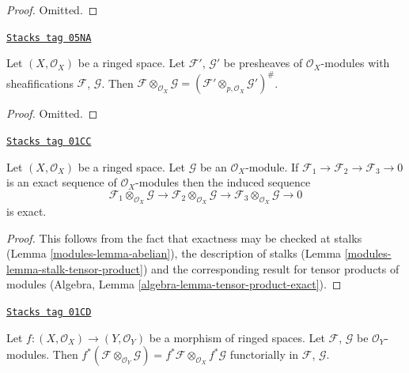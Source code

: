 \begin{proof}
Omitted.
\end{proof}

\begin{lemma}
\label{modules-lemma-tensor-product-sheafification}
\href{https://stacks.math.columbia.edu/tag/05NA}{\texttt{Stacks tag 05NA}}

Let $(X, \mathcal{O}_X)$ be a ringed space.
Let $\mathcal{F}'$, $\mathcal{G}'$ be presheaves of $\mathcal{O}_X$-modules
with sheafifications $\mathcal{F}$, $\mathcal{G}$. Then
$\mathcal{F} \otimes_{\mathcal{O}_X} \mathcal{G} =
(\mathcal{F}' \otimes_{p, \mathcal{O}_X} \mathcal{G}')^\#$.
\end{lemma}

\begin{proof}
Omitted.
\end{proof}


\begin{lemma}
\label{modules-lemma-tensor-product-exact}
\href{https://stacks.math.columbia.edu/tag/01CC}{\texttt{Stacks tag 01CC}}

Let $(X, \mathcal{O}_X)$ be a ringed space.
Let $\mathcal{G}$ be an $\mathcal{O}_X$-module.
If
$\mathcal{F}_1
\to \mathcal{F}_2
\to \mathcal{F}_3
\to 0$
is an exact sequence of $\mathcal{O}_X$-modules then
the induced sequence
$$
\mathcal{F}_1 \otimes_{\mathcal{O}_X} \mathcal{G} \to
\mathcal{F}_2 \otimes_{\mathcal{O}_X} \mathcal{G} \to
\mathcal{F}_3 \otimes_{\mathcal{O}_X} \mathcal{G} \to
0
$$
is exact.
\end{lemma}

\begin{proof}

This follows from the fact that exactness may be checked at stalks
(Lemma \ref{modules-lemma-abelian}), the description of stalks
(Lemma \ref{modules-lemma-stalk-tensor-product}) and the corresponding
result for tensor products of modules
(Algebra, Lemma \ref{algebra-lemma-tensor-product-exact}).
\end{proof}

\begin{lemma}
\label{modules-lemma-tensor-product-pullback}
\href{https://stacks.math.columbia.edu/tag/01CD}{\texttt{Stacks tag 01CD}}

Let $f : (X, \mathcal{O}_X) \to (Y, \mathcal{O}_Y)$ be
a morphism of ringed spaces. Let $\mathcal{F}$, $\mathcal{G}$
be $\mathcal{O}_Y$-modules. Then
$f^*(\mathcal{F} \otimes_{\mathcal{O}_Y} \mathcal{G})
= f^*\mathcal{F} \otimes_{\mathcal{O}_X} f^*\mathcal{G}$
functorially in $\mathcal{F}$, $\mathcal{G}$.
\end{lemma}

